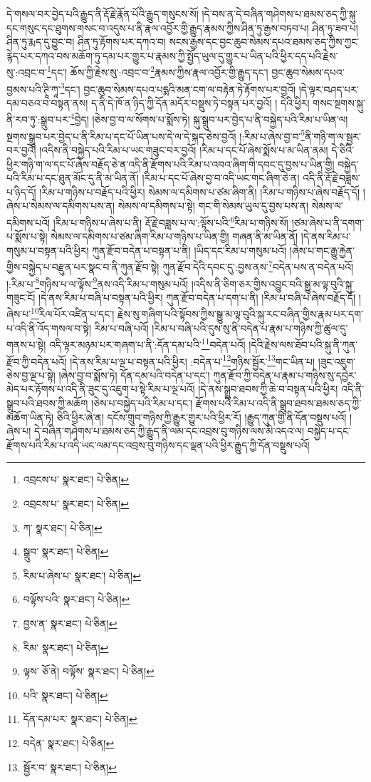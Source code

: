 དེ་གསལ་བར་བྱེད་པའི་རྒྱུད་ནི་རྡོ་རྗེ་རྣོན་པོའི་རྒྱུད་གསུངས་སོ། །དེ་བས་ན་དེ་བཞིན་གཤེགས་པ་ཐམས་ཅད་ཀྱི་སྐུ་དང་གསུང་དང་ཐུགས་གསང་བ་འདུས་པ་ནི་རྣལ་འབྱོར་གྱི་རྒྱུད་རྣམས་ཀྱིས་ཤིན་ཏུ་རྒྱས་བཏབ་པ། ཤིན་ཏུ་ཟབ་པ། ཤིན་ཏུ་རྨད་དུ་བྱུང་བ། ཤིན་ཏུ་རྟོགས་པར་དཀའ་བ། སངས་རྒྱས་དང་བྱང་ཆུབ་སེམས་དཔའ་ཐམས་ཅད་ཀྱིས་ཀྱང་རྙེད་པར་དཀའ་བས་མཆོག་ཏུ་དམ་པར་གྱུར་པ་རྣམས་ཀྱི་སྤྱོད་ཡུལ་དུ་གྱུར་པ་ཡིན་པའི་ཕྱིར་དད་པའི་རྗེས་སུ་:འབྲང་བ་\footnote{འབྲངས་པ་  སྣར་ཐང་།  པེ་ཅིན། }དང་། ཆོས་ཀྱི་རྗེས་སུ་:འབྲང་བ་\footnote{འབྲངས་པ་  སྣར་ཐང་།  པེ་ཅིན། }རྣམས་ཀྱིས་རྣལ་འབྱོར་གྱི་རྒྱུད་དང་། བྱང་ཆུབ་སེམས་དཔའ་བྱམས་པའི་ཊཱི་ཀཱ་\footnote{ཀ་  སྣར་ཐང་།  པེ་ཅིན། }དང་། བྱང་ཆུབ་སེམས་དཔའ་པདྨའི་མན་ངག་ལ་བརྟེན་ཏེ་རྟོགས་པར་བྱའོ། །དེ་ལྟར་བཤད་པར་དམ་བཅའ་བ་བསྟན་ནས། ད་ནི་དེ་ཁོ་ན་ཉིད་ཀྱི་དོན་མདོར་བསྡུས་ཏེ་བསྟན་པར་བྱའོ། །
དེའི་ཕྱིར། གསང་སྔགས་སྐུ་ནི་རབ་ཏུ་:སྒྲུབ་པར་\footnote{སྒྲུབ་  སྣར་ཐང་།  པེ་ཅིན། }བྱེད། །ཅེས་བྱ་བ་ལ་སོགས་པ་སྨོས་ཏེ། སྐུ་སྒྲུབ་པར་བྱེད་པ་ནི་བསྐྱེད་པའི་རིམ་པ་ཡིན་ལ། སྔགས་སྒྲུབ་པར་བྱེད་པ་ནི་རིམ་པ་དང་པོ་ཡིན་པས་དེ་ལ་དེ་སྐད་ཅེས་བྱའོ། །:རིམ་པ་ཞེས་བྱ་བ་\footnote{རིམ་པ་ཞེས་པ་  སྣར་ཐང་།  པེ་ཅིན། }ནི་གཉི་ག་ལ་སྦྱར་བར་བྱའོ། །འདིས་ནི་བསྐྱེད་པའི་རིམ་པ་ཡང་གཟུང་བར་བྱའོ། །རིམ་པ་དང་པོ་ཞེས་སྨོས་པ་མ་ཡིན་ནམ། དེ་ཅིའི་ཕྱིར་གཉི་ག་ལ་དང་པོ་ཞེས་བརྗོད་ཅེ་ན་འདི་ནི་རྫོགས་པའི་རིམ་པ་འབའ་ཞིག་གི་དབང་དུ་བྱས་པ་ཡིན་གྱི། བསྐྱེད་པའི་རིམ་པ་དང་ཐུན་མོང་དུ་ནི་མ་ཡིན་ནོ། །རིམ་པ་དང་པོ་ཞེས་བྱ་བ་འདི་ཡང་གང་ཞིག་ཅེ་ན། འདི་ནི་རྡོ་རྗེ་བཟླས་པ་ཉིད་དོ། །རིམ་པ་གཉིས་པ་བརྗོད་པའི་ཕྱིར། སེམས་ལ་དམིགས་པ་ཙམ་ཞིག་ནི། །རིམ་པ་གཉིས་པ་ཞེས་བརྗོད་དོ། །ཞེས་པ་སེམས་ལ་དམིགས་པས་ན། སེམས་ལ་དམིགས་པ་སྟེ། གང་གི་སེམས་ཡུལ་དུ་བྱས་པས་ན། སེམས་ལ་དམིགས་པའོ། །རིམ་པ་གཉིས་པ་ཞེས་པ་ནི། རྡོ་རྗེ་བཟླས་པ་ལ་:ལྟོས་པའི་\footnote{བལྟོས་པའི་  སྣར་ཐང་།  པེ་ཅིན། }རིམ་པ་གཉིས་སོ། །ཙམ་ཞེས་པ་ནི་དགག་པ་སྨོས་པ་སྟེ། སེམས་ལ་དམིགས་པ་ཙམ་ཞིག་རིམ་པ་གཉིས་པ་ཡིན་གྱི། གཞན་ནི་མ་ཡིན་ནོ། །དེ་ནས་རིམ་པ་གསུམ་པ་བསྟན་པའི་ཕྱིར། ཀུན་རྫོབ་བདེན་པ་བསྟན་པ་ནི། །ཡིད་དང་རིམ་པ་གསུམ་པའོ། །ཞེས་པ་གང་རྒྱུ་རྐྱེན་གྱིས་བསྐྱེད་པ་བརྫུན་པར་སྣང་བ་ནི་ཀུན་རྫོབ་སྟེ། ཀུན་རྫོབ་དེའི་དབང་དུ་:བྱས་ནས་\footnote{བྱས་ན་  སྣར་ཐང་།  པེ་ཅིན། }བདེན་པས་ན་བདེན་པའོ། །:རིམ་པ་\footnote{རིམ་  སྣར་ཐང་།  པེ་ཅིན། }གཉིས་པ་ལ་ལྟོས་\footnote{ལྟས་  ཅོ་ནེ། བལྟོས་  སྣར་ཐང་།  པེ་ཅིན། }ནས་འདི་རིམ་པ་གསུམ་པའོ། །འདིས་ནི་ཅིག་ཅར་གྱིས་འབྱུང་བའི་སྒྱུ་མ་ལྟ་བུའི་སྐུ་གཟུང་ངོ། །དེ་ནས་རིམ་པ་བཞི་པ་བསྟན་པའི་ཕྱིར། ཀུན་རྫོབ་བདེན་པ་དག་པ་ནི། །རིམ་པ་བཞི་པ་ཞེས་བརྗོད་དོ། །ཞེས་པ་\footnote{པའི་  སྣར་ཐང་།  པེ་ཅིན། }རིལ་པོར་འཛིན་པ་དང་། རྗེས་སུ་གཞིག་པའི་སྟོབས་ཀྱིས་སྒྱུ་མ་ལྟ་བུའི་སྐུ་རང་བཞིན་གྱིས་རྣམ་པར་དག་པ་འདི་ནི་འོད་གསལ་བ་སྟེ། རིམ་པ་བཞི་པའོ། །རིམ་པ་བཞི་པའི་དུས་སུ་ནི་བདེན་པ་རྣམ་པ་གཉིས་ཀྱི་ཚུལ་དུ་གནས་པ་སྟེ། འདི་ལྟར་མཉམ་པར་གཞག་པ་ནི་:དོན་དམ་པའི་\footnote{དོན་དམ་པར་  སྣར་ཐང་།  པེ་ཅིན། }བདེན་པའོ། །དེའི་རྗེས་ལས་ཐོབ་པའི་སྐུ་ནི་ཀུན་རྫོབ་ཀྱི་བདེན་པའོ། །དེ་ནས་རིམ་པ་ལྔ་པ་བསྟན་པའི་ཕྱིར། :བདེན་པ་\footnote{བདེན་  སྣར་ཐང་།  པེ་ཅིན། }གཉིས་སྦྱོར་\footnote{སྦྱོར་བ་  སྣར་ཐང་།  པེ་ཅིན། }གང་ཡིན་པ། །ཟུང་འཇུག་ཅེས་བྱ་ལྔ་པ་སྟེ། །ཞེས་བྱ་བ་སྨོས་ཏེ། དོན་དམ་པའི་བདེན་པ་དང་། ཀུན་རྫོབ་ཀྱི་བདེན་པ་རྣམ་པ་གཉིས་སུ་དབྱེར་མེད་པར་རྟོགས་པ་འདི་ནི་ཟུང་དུ་འཇུག་པ་སྟེ་རིམ་པ་ལྔ་པའོ། །དེ་ནས་སྒྲུབ་ཐབས་ཀྱི་ཆེ་བ་བསྟན་པའི་ཕྱིར། འདི་ནི་སྒྲུབ་པའི་ཐབས་ཀྱི་མཆོག །ཅེས་པ་བསྐྱེད་པའི་རིམ་པ་དང་། རྫོགས་པའི་རིམ་པ་འདི་ནི་སྒྲུབ་ཐབས་ཐམས་ཅད་ཀྱི་མཆོག་ཡིན་ཏེ། ཅིའི་ཕྱིར་ཞེ་ན། དངོས་གྲུབ་གཉིས་ཀྱི་རྒྱུར་གྱུར་པའི་ཕྱིར་རོ། །རྒྱུད་ཀུན་གྱི་ནི་དོན་བསྡུས་པའོ། །ཞེས་པ། དེ་བཞིན་གཤེགས་པ་ཐམས་ཅད་ཀྱི་རྒྱུད་ནི་ལམ་དང་འབྲས་བུ་གཉིས་ལས་མི་འདའ་ལ། བསྐྱེད་པ་དང་རྫོགས་པའི་རིམ་པ་འདི་ཡང་ལམ་དང་འབྲས་བུ་གཉིས་དང་ལྡན་པའི་ཕྱིར་རྒྱུད་ཀྱི་དོན་བསྡུས་པའོ། 